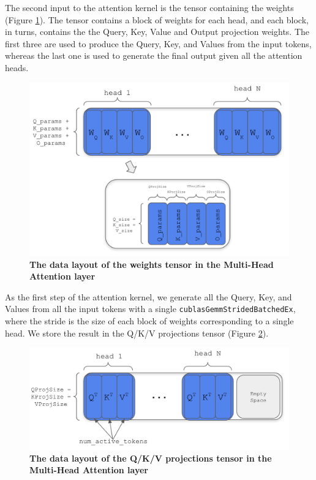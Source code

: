 The second input to the attention kernel is the tensor containing the weights (Figure \ref{fig:mha-weights}). The tensor contains a block of weights for each head, and each block, in turns, contains the the Query, Key, Value and Output projection weights. The first three are used to produce the Query, Key, and Values from the input tokens, whereas the last one is used to generate the final output given all the attention heads.

\begin{figure}[H]
    \centering
    \includegraphics[width=\linewidth]{figures/weights2.png}
    \caption{\textbf{The data layout of the weights tensor in the Multi-Head Attention layer}}
    \label{fig:mha-weights}
\end{figure}

As the first step of the attention kernel, we generate all the Query, Key, and Values from all the input tokens with a single \texttt{cublasGemmStridedBatchedEx}, where the stride is the size of each block of weights corresponding to a single head. We store the result in the Q/K/V projections tensor (Figure \ref{fig:mha-qkv-projs}).

\begin{figure}[H]
    \centering
    \includegraphics[width=\linewidth]{figures/qkv_proj2.png}
    \caption{\textbf{The data layout of the Q/K/V projections tensor in the Multi-Head Attention layer}}
    \label{fig:mha-qkv-projs}
\end{figure}

